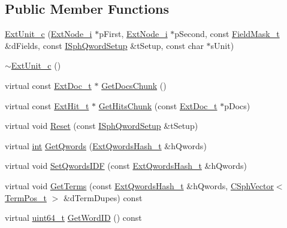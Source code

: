 \subsection*{Public Member Functions}
\begin{DoxyCompactItemize}
\item 
\hyperlink{classExtUnit__c_a90cf7c8efe9148a8d88b3c734b7095cf}{Ext\-Unit\-\_\-c} (\hyperlink{classExtNode__i}{Ext\-Node\-\_\-i} $\ast$p\-First, \hyperlink{classExtNode__i}{Ext\-Node\-\_\-i} $\ast$p\-Second, const \hyperlink{structFieldMask__t}{Field\-Mask\-\_\-t} \&d\-Fields, const \hyperlink{classISphQwordSetup}{I\-Sph\-Qword\-Setup} \&t\-Setup, const char $\ast$s\-Unit)
\item 
\hyperlink{classExtUnit__c_a0cd02d5a5004f05417005c2aea00c245}{$\sim$\-Ext\-Unit\-\_\-c} ()
\item 
virtual const \hyperlink{structExtDoc__t}{Ext\-Doc\-\_\-t} $\ast$ \hyperlink{classExtUnit__c_ac42a9c840a670182e097d840f665350e}{Get\-Docs\-Chunk} ()
\item 
virtual const \hyperlink{structExtHit__t}{Ext\-Hit\-\_\-t} $\ast$ \hyperlink{classExtUnit__c_a5581e0382fa5bed629e6a75e281f0b49}{Get\-Hits\-Chunk} (const \hyperlink{structExtDoc__t}{Ext\-Doc\-\_\-t} $\ast$p\-Docs)
\item 
virtual void \hyperlink{classExtUnit__c_aa273aa14e6918dd1b45f2a307eb3fbfe}{Reset} (const \hyperlink{classISphQwordSetup}{I\-Sph\-Qword\-Setup} \&t\-Setup)
\item 
virtual \hyperlink{sphinxexpr_8cpp_a4a26e8f9cb8b736e0c4cbf4d16de985e}{int} \hyperlink{classExtUnit__c_a057a2bb44affd5c86cb3e15a39b26c40}{Get\-Qwords} (\hyperlink{sphinxsearch_8cpp_a814fc096e1ffb29d072d79b72b702fe6}{Ext\-Qwords\-Hash\-\_\-t} \&h\-Qwords)
\item 
virtual void \hyperlink{classExtUnit__c_ad3fca4d882746b4e4930f18802aacc34}{Set\-Qwords\-I\-D\-F} (const \hyperlink{sphinxsearch_8cpp_a814fc096e1ffb29d072d79b72b702fe6}{Ext\-Qwords\-Hash\-\_\-t} \&h\-Qwords)
\item 
virtual void \hyperlink{classExtUnit__c_a2042447e16acebdbf963013e5fc220e0}{Get\-Terms} (const \hyperlink{sphinxsearch_8cpp_a814fc096e1ffb29d072d79b72b702fe6}{Ext\-Qwords\-Hash\-\_\-t} \&h\-Qwords, \hyperlink{classCSphVector}{C\-Sph\-Vector}$<$ \hyperlink{structTermPos__t}{Term\-Pos\-\_\-t} $>$ \&d\-Term\-Dupes) const 
\item 
virtual \hyperlink{sphinxstd_8h_aaa5d1cd013383c889537491c3cfd9aad}{uint64\-\_\-t} \hyperlink{classExtUnit__c_a51bddf006e41396dd1b70000fae4a66c}{Get\-Word\-I\-D} () const 

\end{DoxyCompactItemize}

